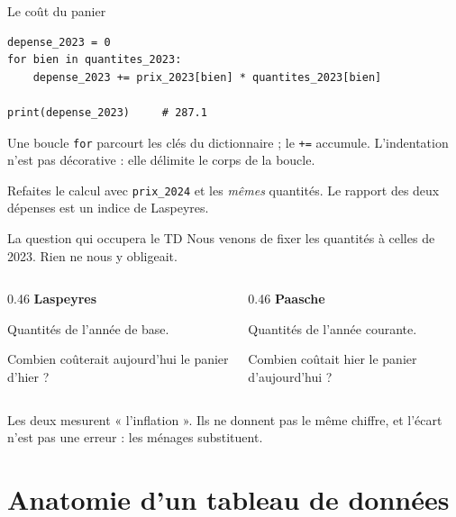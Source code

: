 \documentclass[10pt,aspectratio=169]{beamer}
\begin{document}
\begin{frame}[fragile]{Le coût du panier}
\begin{lstlisting}
depense_2023 = 0
for bien in quantites_2023:
    depense_2023 += prix_2023[bien] * quantites_2023[bien]

print(depense_2023)     # 287.1
\end{lstlisting}

\vspace{1.2em}
Une boucle \texttt{for} parcourt les clés du dictionnaire ; le \texttt{+=} accumule. L'indentation n'est pas décorative : elle délimite le corps de la boucle.

\vspace{1em}
Refaites le calcul avec \texttt{prix\_2024} et les \emph{mêmes} quantités. Le rapport des deux dépenses est un indice de Laspeyres.
\end{frame}

\begin{frame}{La question qui occupera le TD}
Nous venons de fixer les quantités à celles de 2023. Rien ne nous y obligeait.

\vspace{1.5em}
\begin{columns}[T]
\begin{column}{0.46\textwidth}
\textbf{Laspeyres}

\vspace{0.5em}
Quantités de l'année de base.

\vspace{0.5em}
\small\color{CYgris}
Combien coûterait aujourd'hui le panier d'hier ?
\end{column}
\begin{column}{0.46\textwidth}
\textbf{Paasche}

\vspace{0.5em}
Quantités de l'année courante.

\vspace{0.5em}
\small\color{CYgris}
Combien coûtait hier le panier d'aujourd'hui ?
\end{column}
\end{columns}

\vspace{1.8em}
Les deux mesurent « l'inflation ». Ils ne donnent pas le même chiffre, et l'écart n'est pas une erreur : les ménages substituent.
\end{frame}

\section{Anatomie d'un tableau de données}
\end{document}
